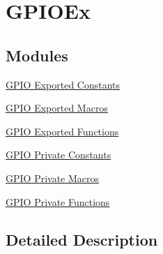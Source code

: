 \hypertarget{group___g_p_i_o_ex}{}\section{G\+P\+I\+O\+Ex}
\label{group___g_p_i_o_ex}
\subsection*{Modules}
\begin{DoxyCompactItemize}
\item 
\hyperlink{group___g_p_i_o_ex___exported___constants}{G\+P\+I\+O Exported Constants}
\item 
\hyperlink{group___g_p_i_o_ex___exported___macros}{G\+P\+I\+O Exported Macros}
\item 
\hyperlink{group___g_p_i_o_ex___exported___functions}{G\+P\+I\+O Exported Functions}
\item 
\hyperlink{group___g_p_i_o_ex___private___constants}{G\+P\+I\+O Private Constants}
\item 
\hyperlink{group___g_p_i_o_ex___private___macros}{G\+P\+I\+O Private Macros}
\item 
\hyperlink{group___g_p_i_o_ex___private___functions}{G\+P\+I\+O Private Functions}
\end{DoxyCompactItemize}


\subsection{Detailed Description}
